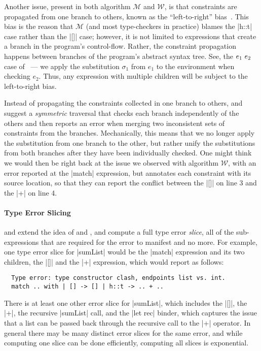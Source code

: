Another issue, present in both algorithm $\mathcal{M}$ and
$\mathcal{W}$, is that constraints are propagated from one branch to
others, known as the ``left-to-right'' bias~\citep{McAdam1998-ub}.
%
This bias is the reason that $\mathcal{M}$ (and most type-checkers in
practice) blames the |h::t| case rather than the |[]| case; however,
it is not limited to expressions that create a branch in the program's
control-flow.
%
Rather, the constraint propagation happens between branches of the
program's abstract syntax tree.
%
See, \eg the $e_1\ e_2$ case of \W\ --- we apply the substitution
$\sigma_1$ from $e_1$ to the environment when checking $e_2$.
%
Thus, any expression with multiple children will be subject to the
left-to-right bias.

Instead of propagating the constraints collected in one branch to
others, \citet{McAdam1998-ub} and \citet{Yang1999-yr} suggest a
\emph{symmetric} traversal that checks each branch independently of the
others and then reports an error when merging two inconsistent sets of
constraints from the branches.
%
Mechanically, this means that we no longer apply the substitution from
one branch to the other, but rather unify the substitutions from both
branches after they have been individually checked.
%
One might think we would then be right back at the issue we observed
with algorithm $\mathcal{W}$, with an error reported at the |match|
expression, but \citeauthor{Yang1999-yr} annotates each constraint with
its source location, so that they can report the conflict between the
|[]| on line 3 and the |+| on line 4.

\paragraph{Type Error Slicing}
\citet{Tip2001-qp} and \citet{Haack2003-vc} extend the idea of
\citeauthor{McAdam1998-ub} and \citeauthor{Yang1999-yr}, and compute a
full type error \emph{slice}, \ie all of the sub-expressions that are
required for the error to manifest and no more.
%
For example, one type error slice for |sumList| would be the |match|
expression and its two children, the |[]| and the |+| expression,
which \cite{Haack2003-vc} would report as follows:
%
\begin{verbatim}
  Type error: type constructor clash, endpoints list vs. int.
  match .. with | [] -> [] | h::t -> .. + ..
\end{verbatim}

There is at least one other error slice for |sumList|, which includes
the |[]|, the |+|, the recursive |sumList| call, and the |let rec|
binder, which captures the issue that a list can be passed back through
the recursive call to the |+| operator.
%
In general there may be many distinct error slices for the same error,
and while computing one slice can be done efficiently,
computing all slices is exponential.

